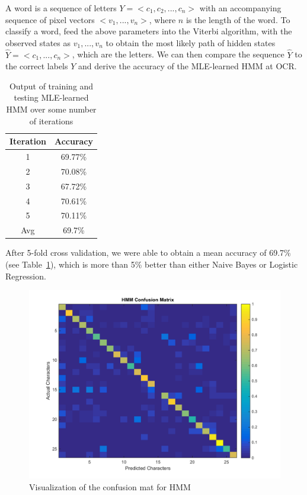 \documentclass{article} %
\begin{document}

A word is a sequence of letters $Y = <c_1, c_2, ..., c_n>$ with an accompanying sequence of pixel vectors $<v_1, ..., v_n>$, where $n$ is the length of the word. To classify a word, feed the above parameters into the Viterbi algorithm, with the observed states as $v_1, ..., v_n$ to obtain the most likely path of hidden states $\hat{Y} = <c_1, ..., c_n>$, which are the letters. We can then compare the sequence $\hat{Y}$ to the correct labels $Y$ and derive the accuracy of the MLE-learned HMM at OCR.

\begin{table}[h]
\centering
\begin{tabular}{|c|c|}
\hline
Iteration & Accuracy \\
\hline
1 & 69.77\% \\
2 & 70.08\% \\
3 & 67.72\% \\
4 & 70.61\% \\
5 & 70.11\% \\
\hline
Avg & 69.7\% \\ 
\hline
\end{tabular}
\caption{Output of training and testing MLE-learned HMM over some number of iterations}
\label{tab:mle-hmm-results}
\end{table}

After 5-fold cross validation, we were able to obtain a mean accuracy of 69.7\% (see Table~\ref{tab:mle-hmm-results}), which is more than 5\% better than either Naive Bayes or Logistic Regression.\\

\begin{figure}[h]
\begin{center}
\includegraphics[scale=0.4]{confusion_hmm.png}
\end{center}
\caption{Visualization of the confusion mat for HMM}
\end{figure}
\end{document}
